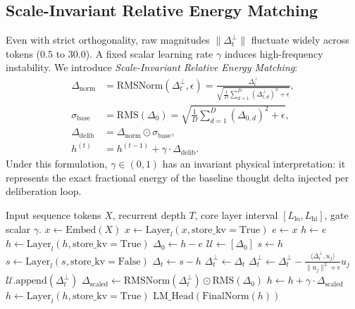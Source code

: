 \documentclass[11pt,a4paper]{article}
\theoremstyle{plain}
\theoremstyle{definition}
\theoremstyle{remark}
\begin{document}
\subsection{Scale-Invariant Relative Energy Matching}
Even with strict orthogonality, raw magnitudes $\|\Delta_t^\perp\|$ fluctuate widely across tokens ($0.5$ to $30.0$). A fixed scalar learning rate $\gamma$ induces high-frequency instability. We introduce \textit{Scale-Invariant Relative Energy Matching}:
\begin{align}
    \Delta_{\text{norm}} &= \text{RMSNorm}(\Delta_t^\perp, \epsilon) = \frac{\Delta_t^\perp}{\sqrt{\frac{1}{D}\sum_{d=1}^D (\Delta_{t,d}^\perp)^2 + \epsilon}}, \\
    \sigma_{\text{base}} &= \text{RMS}(\Delta_0) = \sqrt{\frac{1}{D}\sum_{d=1}^D (\Delta_{0,d})^2 + \epsilon}, \\
    \Delta_{\text{delib}} &= \Delta_{\text{norm}} \odot \sigma_{\text{base}}, \\
    h^{(t)} &= h^{(t-1)} + \gamma \cdot \Delta_{\text{delib}}.
\end{align}
Under this formulation, $\gamma \in (0, 1)$ has an invariant physical interpretation: it represents the exact fractional energy of the baseline thought delta injected per deliberation loop.

\begin{algorithm}[t]
\caption{ORSD Latent Inference Engine with KV Cache Isolation}
\begin{algorithmic}[1]
\Require Input sequence tokens $X$, recurrent depth $T$, core layer interval $[L_{\text{lo}}, L_{\text{hi}}]$, gate scalar $\gamma$.
\State $x \gets \text{Embed}(X)$
 
    \State $x \gets \text{Layer}_l(x, \text{store\_kv}=\text{True})$
\EndFor
\State $e \gets x$ 
\State $h \gets e$
 
    \State $h \gets \text{Layer}_l(h, \text{store\_kv}=\text{True})$ 
\EndFor
\State $\Delta_0 \gets h - e$
\State $\mathcal{U} \gets [ \Delta_0 ]$
 
    \State $s \gets h$
        \State $s \gets \text{Layer}_l(s, \text{store\_kv}=\text{False})$ 
    \EndFor
    \State $\Delta_t \gets s - h$ 
    \State $\Delta_t^\perp \gets \Delta_t$
     
        \State $\Delta_t^\perp \gets \Delta_t^\perp - \frac{\langle \Delta_t^\perp, u_j \rangle}{\|u_j\|^2 + \epsilon} u_j$
    \EndFor
    \State $\mathcal{U}.\text{append}(\Delta_t^\perp)$
    \State $\Delta_{\text{scaled}} \gets \text{RMSNorm}(\Delta_t^\perp) \odot \text{RMS}(\Delta_0)$
    \State $h \gets h + \gamma \cdot \Delta_{\text{scaled}}$
\EndFor
{} 
    \State $h \gets \text{Layer}_l(h, \text{store\_kv}=\text{True})$
\EndFor
\State \Return $\text{LM\_Head}(\text{FinalNorm}(h))$
\end{algorithmic}
\end{algorithm}
\end{document}
